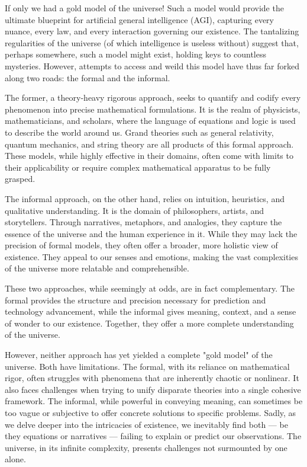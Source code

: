 If only we had a gold model of the universe! Such a model would provide the ultimate blueprint for artificial general intelligence (AGI), capturing every nuance, every law, and every interaction governing our existence. The tantalizing regularities of the universe (of which intelligence is useless without) suggest that, perhaps somewhere, such a model might exist, holding keys to countless mysteries. However, attempts to access and weild this model have thus far forked along two roads: the formal and the informal.

The former, a theory-heavy rigorous approach, seeks to quantify and codify every phenomenon into precise mathematical formulations. It is the realm of physicists, mathematicians, and scholars, where the language of equations and logic is used to describe the world around us. Grand theories such as general relativity, quantum mechanics, and string theory are all products of this formal approach. These models, while highly effective in their domains, often come with limits to their applicability or require complex mathematical apparatus to be fully grasped.

The informal approach, on the other hand, relies on intuition, heuristics, and qualitative understanding. It is the domain of philosophers, artists, and storytellers. Through narratives, metaphors, and analogies, they capture the essence of the universe and the human experience in it. While they may lack the precision of formal models, they often offer a broader, more holistic view of existence. They appeal to our senses and emotions, making the vast complexities of the universe more relatable and comprehensible.

These two approaches, while seemingly at odds, are in fact complementary. The formal provides the structure and precision necessary for prediction and technology advancement, while the informal gives meaning, context, and a sense of wonder to our existence. Together, they offer a more complete understanding of the universe.

However, neither approach has yet yielded a complete "gold model" of the universe. Both have limitations. The formal, with its reliance on mathematical rigor, often struggles with phenomena that are inherently chaotic or nonlinear. It also faces challenges when trying to unify disparate theories into a single cohesive framework. The informal, while powerful in conveying meaning, can sometimes be too vague or subjective to offer concrete solutions to specific problems. Sadly, as we delve deeper into the intricacies of existence, we inevitably find both — be they equations or narratives — failing to explain or predict our observations. The universe, in its infinite complexity, presents challenges not surmounted by one alone.

